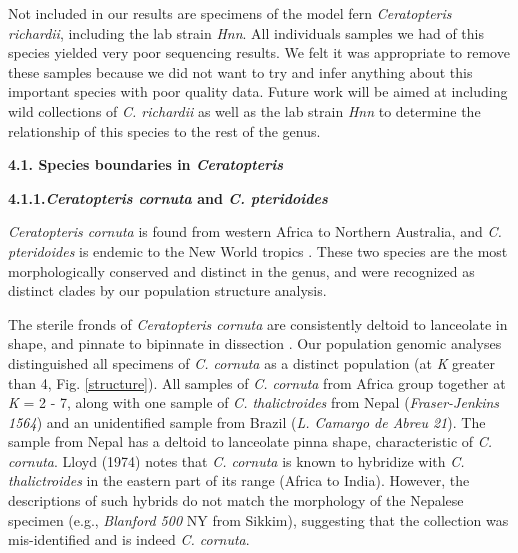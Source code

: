 \documentclass[12pt]{article}
\begin{document}
\begin{flushleft}
Not included in our results are specimens of the model fern \textit{Ceratopteris richardii}, including the lab strain \textit{Hnn}. All individuals samples we had of this species yielded very poor sequencing results. We felt it was appropriate to remove these samples because we did not want to try and infer anything about this important species with poor quality data. Future work will be aimed at including wild collections of \textit{C. richardii} as well as the lab strain \textit{Hnn} to determine the relationship of this species to the rest of the genus.

\textbf{4.1. Species boundaries in \textit{Ceratopteris}} 

\textbf{4.1.1.\textit{Ceratopteris cornuta} and \textit{C. pteridoides}}

\textit{Ceratopteris cornuta} is found from western Africa to Northern Australia, and \textit{C. pteridoides} is endemic to the New World tropics \autocite{LloydTax1974}. These two species are the most morphologically conserved and distinct in the genus, and were recognized as distinct clades by our population structure analysis. 

The sterile fronds of \textit{Ceratopteris cornuta} are consistently deltoid to lanceolate in shape, and pinnate to bipinnate in dissection \autocite{LloydTax1974}. Our population genomic analyses distinguished all specimens of \textit{C. cornuta} as a distinct population (at \textit{K} greater than 4, Fig. \ref{structure}). All samples of \textit{C. cornuta} from Africa group together at \textit{K} = 2 - 7, along with one sample of \textit{C. thalictroides} from Nepal (\textit{Fraser-Jenkins 1564}) and an unidentified sample from Brazil (\textit{L. Camargo de Abreu 21}). The sample from Nepal has a deltoid to lanceolate pinna shape, characteristic of \textit{C. cornuta}. Lloyd (1974) notes that \textit{C. cornuta} is known to hybridize with \textit{C. thalictroides} in the eastern part of its range (Africa to India). However, the descriptions of such hybrids do not match the morphology of the Nepalese specimen (e.g., \textit{Blanford 500} NY from Sikkim), suggesting that the collection was mis-identified and is indeed \textit{C. cornuta}. 


\end{flushleft}
\end{document}
